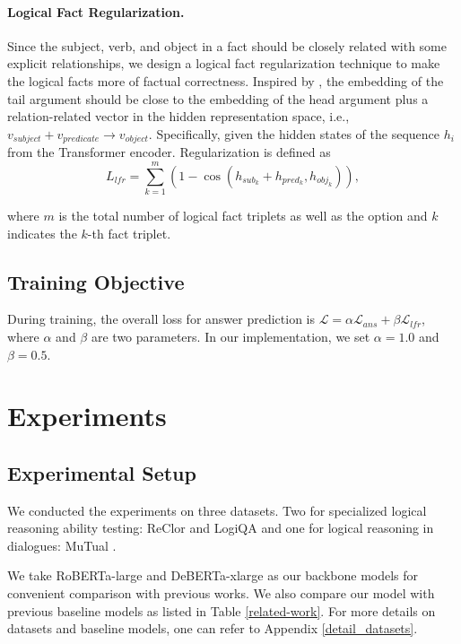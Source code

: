 \documentclass[11pt]{article}
\begin{document}
\paragraph{Logical Fact Regularization.}Since the subject, verb, and object in a fact should be closely related with some explicit relationships, we design a logical fact regularization technique to make the logical facts more of factual correctness.
Inspired by \cite{NIPS2013_1cecc7a7}, the embedding of the tail argument should be close to the embedding of the head argument plus a relation-related vector in the hidden representation space, i.e.,
$v_{subject} + v_{predicate}\rightarrow v_{object}$. Specifically, given the hidden states of the sequence $h_i$ from the Transformer encoder. Regularization is defined as
\begin{equation}
     L_{lfr} = \sum_{k=1}^{m}(1-\cos(h_{sub_{k}}+h_{pred_{k}}, h_{obj_{k}})),
\end{equation}
   
where $m$ is the total number of logical fact triplets as well as the option and $k$ indicates the $k$-th fact triplet.

\subsection{Training Objective}
During training, the overall loss for answer prediction is $\mathcal{L} = \alpha\mathcal{L}_{ans} + \beta\mathcal{L}_{lfr}$,
where $\alpha$ and $\beta$ are two parameters. In our implementation, we set $\alpha=1.0$ and $\beta=0.5$.

\section{Experiments}
\label{others}

\subsection{Experimental Setup}
We conducted the experiments on three datasets. Two for specialized logical reasoning ability testing: ReClor \citep{yu2020reclor} and LogiQA \citep{ijcai2020-0501} and one for logical reasoning in dialogues: MuTual \citep{mutual}.

We take RoBERTa-large \citep{2019arXiv190711692L} and DeBERTa-xlarge \citep{he2020deberta} as our backbone models for convenient comparison with previous works. We also compare our model with previous baseline models as listed in Table \ref{related-work}. For more details on datasets and baseline models, one can refer to Appendix \ref{detail_datasets}.
\end{document}
